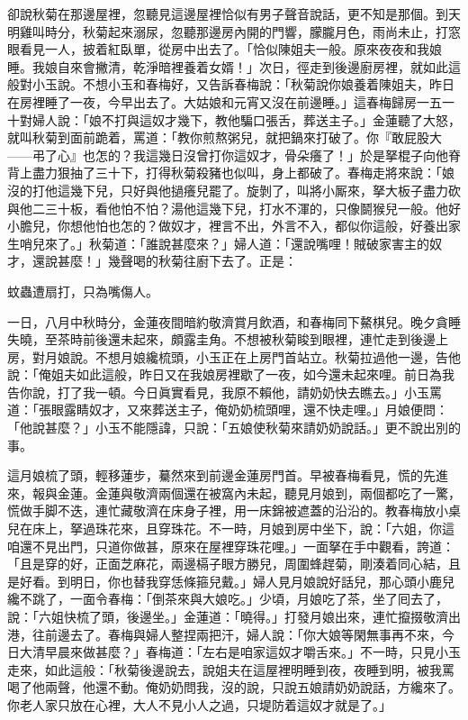卻說秋菊在那邊屋裡，忽聽見這邊屋裡恰似有男子聲音說話，更不知是那個。到天明雞叫時分，秋菊起來溺尿，忽聽那邊房內開的門響，朦朧月色，雨尚未止，打窓眼看見一人，披着紅臥單，從房中出去了。「恰似陳姐夫一般。{}原來夜夜和我娘睡。我娘自來會撇清，乾淨暗裡養着女婿！」次日，徑走到後邊廚房裡，就如此這般對小玉說。不想小玉和春梅好，又告訴春梅說：「秋菊說你娘養着陳姐夫，昨日在房裡睡了一夜，今早出去了。大姑娘和元宵又沒在前邊睡。」這春梅歸房一五一十對婦人說：「娘不打與這奴才幾下，教他騙口張舌，葬送主子。」金蓮聽了大怒，就叫秋菊到面前跪着，罵道：「教你煎熬粥兒，就把鍋來打破了。你『敢屁股大——弔了心』也怎的？我這幾日沒曾打你這奴才，骨朵癢了！」於是拏棍子向他脊背上盡力狠抽了三十下，打得秋菊殺豬也似叫，身上都破了。{}春梅走將來說：「娘沒的打他這幾下兒，只好與他撾癢兒罷了。旋剝了，叫將小厮來，拏大板子盡力砍與他二三十板，看他怕不怕？湯他這幾下兒，打水不渾的，只像鬬猴兒一般。他好小膽兒，你想他怕也怎的？做奴才，裡言不出，外言不入，都似你這般，好養出家生哨兒來了。」{}秋菊道：「誰說甚麼來？」婦人道：「還說嘴哩！賊破家害主的奴才，還說甚麼！」幾聲喝的秋菊往廚下去了。正是：

\begin{myquote}
蚊蟲遭扇打，只為嘴傷人。
\end{myquote}

一日，八月中秋時分，金蓮夜間暗約敬濟賞月飲酒，和春梅同下鰲棋兒。晚夕貪睡失曉，至茶時前後還未起來，頗露圭角。不想被秋菊睃到眼裡，連忙走到後邊上房，對月娘說。不想月娘纔梳頭，小玉正在上房門首站立。秋菊拉過他一邊，告他說：「俺姐夫如此這般，昨日又在我娘房裡歇了一夜，如今還未起來哩。前日為我告你說，打了我一頓。今日眞實看見，我原不賴他，請奶奶快去瞧去。」小玉罵道：「張眼露睛奴才，又來葬送主子，俺奶奶梳頭哩，還不快走哩。」月娘便問：「他說甚麼？」小玉不能隱諱，只說：「五娘使秋菊來請奶奶說話。」更不說出別的事。

這月娘梳了頭，輕移蓮步，驀然來到前邊金蓮房門首。早被春梅看見，慌的先進來，報與金蓮。金蓮與敬濟兩個還在被窩內未起，聽見月娘到，兩個都吃了一驚，慌做手脚不迭，連忙藏敬濟在床身子裡，用一床錦被遮蓋的沿沿的。{}教春梅放小桌兒在床上，拏過珠花來，且穿珠花。不一時，月娘到房中坐下，說：「六姐，你這咱還不見出門，只道你做甚，原來在屋裡穿珠花哩。」一面拏在手中觀看，誇道：「且是穿的好，正面芝麻花，兩邊槅子眼方勝兒，周圍蜂趕菊，剛湊着同心結，且是好看。到明日，你也替我穿恁條箍兒戴。」婦人見月娘說好話兒，那心頭小鹿兒纔不跳了，一面令春梅：「倒茶來與大娘吃。」少頃，月娘吃了茶，坐了囘去了，說：「六姐快梳了頭，後邊坐。」金蓮道：「曉得。」打發月娘出來，連忙攛掇敬濟出港，往前邊去了。春梅與婦人整捏兩把汗，婦人說：「你大娘等閑無事再不來，今日大清早晨來做甚麼？」春梅道：「左右是咱家這奴才嚼舌來。」不一時，只見小玉走來，如此這般：「秋菊後邊說去，說姐夫在這屋裡明睡到夜，夜睡到明，被我罵喝了他兩聲，他還不動。{}俺奶奶問我，沒的說，只說五娘請奶奶說話，方纔來了。你老人家只放在心裡，大人不見小人之過，只堤防着這奴才就是了。」

